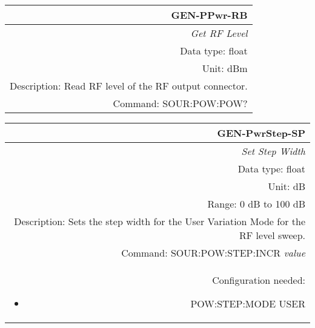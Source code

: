 \documentclass[openany]{article}
\begin{document}
		\begin{tabular}{N}
			\hline
			\bfseries GEN-PPwr-RB \\ \hline
			\emph{Get RF Level} \\
			Data type: float \\
			Unit: dBm \\
			Description: Read RF level of the RF output connector. \\
			Command: SOUR:POW:POW? \\

		\end{tabular}
%
		\begin{tabular}{N}
			\hline
			\bfseries GEN-PwrStep-SP \\ \hline
			\emph{Set Step Width} \\
			Data type: float \\
			Unit: dB \\
			Range: 0 dB to 100 dB \\
			Description: Sets the step width for the User Variation Mode for the RF level sweep. \\
			Command: SOUR:POW:STEP:INCR \emph{value} \\
			Configuration needed: \begin{itemize}[noitemsep]
				\small
				\item[] POW:STEP:MODE USER
			\end{itemize} \\

		\end{tabular}
\end{document}
